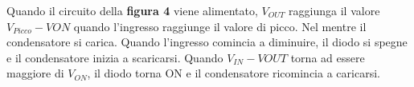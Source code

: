 \documentclass[\main/main.tex]{subfiles}
\begin{document}
Quando il circuito della \textbf{figura 4} viene alimentato, $V_{OUT}$ raggiunga il valore $V_{Picco}-V{ON}$ quando l'ingresso raggiunge il valore di picco. Nel mentre il condensatore si carica. 
Quando l'ingresso comincia a diminuire, il diodo si spegne e il condensatore inizia a scaricarsi.
Quando $V_{IN}-V{OUT}$ torna ad essere maggiore di $V_{ON}$, il diodo torna ON e il condensatore ricomincia a caricarsi.

\begin{figure}
\end{figure}
\end{document}
